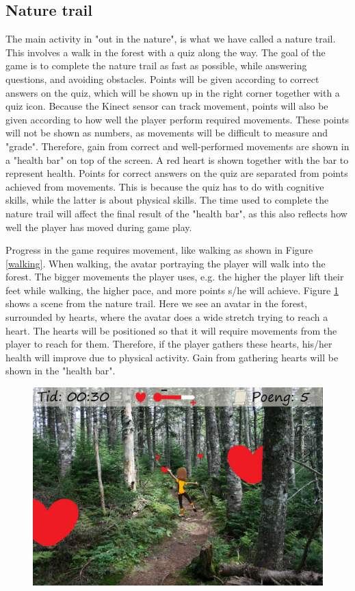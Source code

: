 \subsection{Nature trail}
The main activity in "out in the nature", is what we have called a nature trail. This involves a walk in the forest with a quiz along the way. The goal of the game is to complete the nature trail as fast as possible, while answering questions, and avoiding obstacles. Points will be given according to correct answers on the quiz, which will be shown up in the right corner together with a quiz icon. Because the Kinect sensor can track movement, points will also be given according to how well the player perform required movements. These points will not be shown as numbers, as movements will be difficult to measure and "grade". Therefore, gain from correct and well-performed movements are shown in a "health bar" on top of the screen. A red heart is shown together with the bar to represent health. Points for correct answers on the quiz are separated from points achieved from movements. This is because the quiz has to do with cognitive skills, while the latter is about physical skills. The time used to complete the nature trail will affect the final result of the "health bar", as this also reflects how well the player has moved during game play.   

Progress in the game requires movement, like walking as shown in Figure \ref{walking}. When walking, the avatar portraying the player will walk into the forest. The bigger movements the player uses, e.g. the higher the player lift their feet while walking, the higher pace, and more points s/he will achieve. Figure \ref{fig:hearts} shows a scene from the nature trail. Here we see an avatar in the forest, surrounded by hearts, where the avatar does a wide stretch trying to reach a heart. The hearts will be positioned so that it will require movements from the player to reach for them. Therefore, if the player gathers these hearts, his/her health will improve due to physical activity. Gain from gathering hearts will be shown in the "health bar".   

\begin{figure} [H]
\centering
\includegraphics[scale=0.5]{hjerter.jpg}
\caption[Nature trail - stretching]{}
\label{fig:hearts}
\end{figure}

